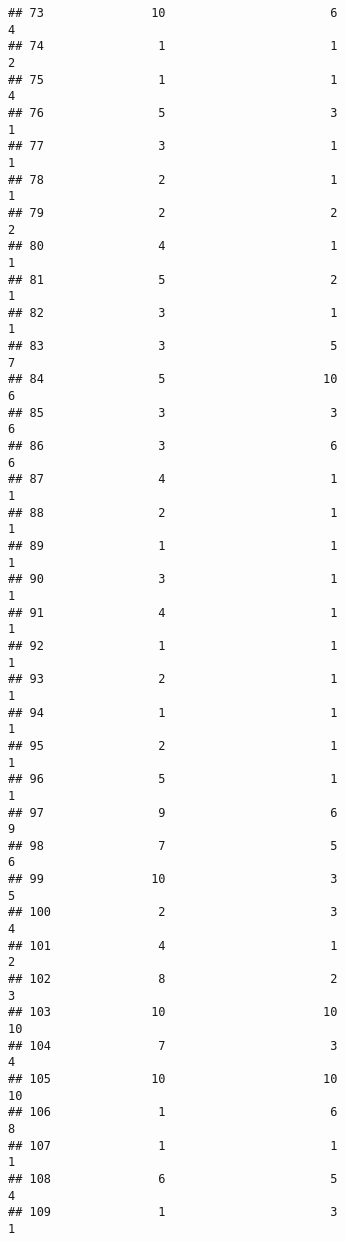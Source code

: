 \documentclass[
]{article}
\begin{document}
\begin{verbatim}
## 73               10                       6                        4
## 74                1                       1                        2
## 75                1                       1                        4
## 76                5                       3                        1
## 77                3                       1                        1
## 78                2                       1                        1
## 79                2                       2                        2
## 80                4                       1                        1
## 81                5                       2                        1
## 82                3                       1                        1
## 83                3                       5                        7
## 84                5                      10                        6
## 85                3                       3                        6
## 86                3                       6                        6
## 87                4                       1                        1
## 88                2                       1                        1
## 89                1                       1                        1
## 90                3                       1                        1
## 91                4                       1                        1
## 92                1                       1                        1
## 93                2                       1                        1
## 94                1                       1                        1
## 95                2                       1                        1
## 96                5                       1                        1
## 97                9                       6                        9
## 98                7                       5                        6
## 99               10                       3                        5
## 100               2                       3                        4
## 101               4                       1                        2
## 102               8                       2                        3
## 103              10                      10                       10
## 104               7                       3                        4
## 105              10                      10                       10
## 106               1                       6                        8
## 107               1                       1                        1
## 108               6                       5                        4
## 109               1                       3                        1

\end{verbatim}
\end{document}
